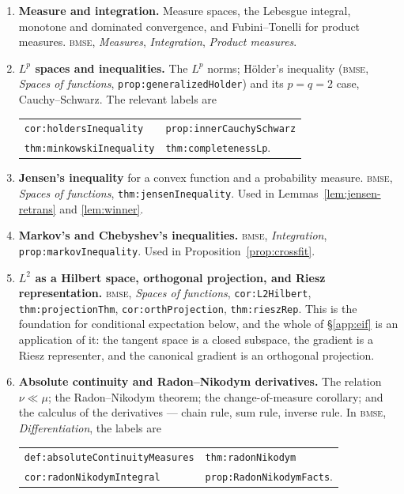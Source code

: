\documentclass[11pt,a4paper]{article}
\theoremstyle{plain}
\theoremstyle{definition}
\theoremstyle{remark}
\newcommand{\code}[1]{\texttt{\small #1}}
\newcommand{\probrepo}{\textsc{bmse}}
\begin{document}
\begin{enumerate}[leftmargin=*]
\item \textbf{Measure and integration.} Measure spaces, the Lebesgue integral, monotone and
dominated convergence, and Fubini--Tonelli for product measures. \probrepo{}, \emph{Measures},
\emph{Integration}, \emph{Product measures}.
\item \textbf{$L^p$ spaces and inequalities.} The $L^p$ norms; Hölder's inequality (\probrepo{},
\emph{Spaces of functions}, \code{prop:generalizedHolder}) and its $p=q=2$ case,
Cauchy--Schwarz. The relevant labels are
\begin{center}
\begin{tabular}{ll}
\code{cor:holdersInequality} & \code{prop:innerCauchySchwarz}\\
\code{thm:minkowskiInequality} & \code{thm:completenessLp}.
\end{tabular}
\end{center}
\item \textbf{Jensen's inequality} for a convex function and a probability measure. \probrepo{},
\emph{Spaces of functions}, \code{thm:jensenInequality}. Used in
Lemmas~\ref{lem:jensen-retrans} and \ref{lem:winner}.
\item \textbf{Markov's and Chebyshev's inequalities.} \probrepo{}, \emph{Integration},
\code{prop:markovInequality}. Used in Proposition~\ref{prop:crossfit}.
\item \textbf{$L^2$ as a Hilbert space, orthogonal projection, and Riesz representation.}
\probrepo{}, \emph{Spaces of functions}, \code{cor:L2Hilbert}, \code{thm:projectionThm},
\code{cor:orthProjection}, \code{thm:rieszRep}. This is the foundation for conditional
expectation below, and the whole of \S\ref{app:eif} is an application of it: the tangent space
is a closed subspace, the gradient is a Riesz representer, and the canonical gradient is an
orthogonal projection.
\item \textbf{Absolute continuity and Radon--Nikodym derivatives.} The relation $\nu\ll\mu$;
the Radon--Nikodym theorem; the change-of-measure corollary; and the calculus of the derivatives
--- chain rule, sum rule, inverse rule. In \probrepo{}, \emph{Differentiation}, the labels are
\begin{center}
\begin{tabular}{ll}
\code{def:absoluteContinuityMeasures} & \code{thm:radonNikodym}\\
\code{cor:radonNikodymIntegral} & \code{prop:RadonNikodymFacts}.
\end{tabular}

\end{center}
\end{enumerate}
\end{document}
